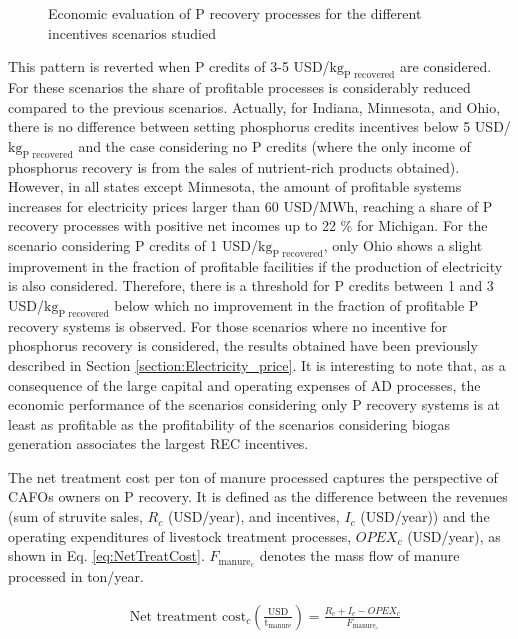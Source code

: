\begin{refsection}[referencesCh5]
\begin{figure}[h!]
	\caption{Economic evaluation of P recovery processes for the different incentives scenarios studied}
	\label{fig:AllScenarios}
\end{figure}

This pattern is reverted when P credits of 3-5 USD/${\text{kg}_\text{P recovered}}$ are considered. For these scenarios the share of profitable processes is considerably reduced compared to the previous scenarios. Actually, for Indiana, Minnesota, and Ohio, there is no difference between setting phosphorus credits incentives below 5 USD/${\text{kg}_\text{P recovered}}$ and the case considering no P credits (where the only income of phosphorus recovery is from the sales of nutrient-rich products obtained). However, in all states except Minnesota, the amount of profitable systems increases for electricity prices larger than 60 USD/MWh, reaching a share of P recovery processes with positive net incomes up to 22 \% for Michigan. For the scenario considering P credits of 1 USD/${\text{kg}_\text{P recovered}}$, only Ohio shows a slight improvement in the fraction of profitable facilities if the production of electricity is also considered. Therefore, there is a threshold for P credits between 1 and 3 USD/$\text{kg}_\text{P recovered}$ below which no improvement in the fraction of profitable P recovery systems is observed. For those scenarios where no incentive for phosphorus recovery is considered, the results obtained have been previously described in Section \ref{section:Electricity_price}. It is interesting to note that, as a consequence of the large capital and operating expenses of AD processes, the economic performance of the scenarios considering only P recovery systems is at least as profitable as the profitability of the scenarios considering biogas generation associates the largest REC incentives.

The net treatment cost per ton of manure processed captures the perspective of CAFOs owners on P recovery. It is defined as the difference between the revenues (sum of struvite sales, $R_{c}$ (USD/year), and incentives, $I_{c}$ (USD/year)) and the operating expenditures of livestock treatment processes, $OPEX_{c}$ (USD/year), as shown in Eq. \ref{eq:NetTreatCost}. $F_{\text{manure}_{c}}$ denotes the mass flow of manure processed in ton/year.

\begin{align}
& \text{Net treatment cost}_c \left(\frac{\text{USD}}{\text{t}_{\text{manure}}}\right) = \frac{R_{c} + I_{c} - OPEX_{c}}{F_{\text{manure}_{c}}} \label{eq:NetTreatCost}
\end{align}


\end{refsection}

